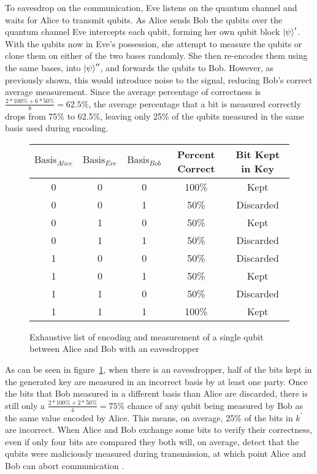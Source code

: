 To eavesdrop on the communication, Eve listens on the quantum channel and waits for Alice to transmit qubits.
As Alice sends Bob the qubits over the quantum channel Eve intercepts each qubit, forming her own qubit block $\ket{\psi}^\prime$.
With the qubits now in Eve's possession, she attempt to measure the qubits or clone them on either of the two bases randomly.
She then re-encodes them using the same bases, into $\ket{\psi}^{\prime\prime}$, and forwards the qubits to Bob.
However, as previously shown, this would introduce noise to the signal, reducing Bob's correct average measurement.
Since the average percentage of correctness is $\frac{2 * 100\% + 6 * 50\%}{8} = 62.5\%$, the average percentage that a bit is measured correctly drops from 75\% to 62.5\%, leaving only 25\% of the qubits measured in the same basis used during encoding.
\begin{figure}[htp]
	\centering
	\begin{tabular}{|c|c|c|c|c|}
		\hline
		$\textrm{Basis}_{Alice}$ & $\textrm{Basis}_{Eve}$ &$\textrm{Basis}_{Bob}$ & Percent Correct & Bit Kept in Key\\ \hline
    	0 & 0 & 0 & 100\% & Kept \\ \hline		
    	0 & 0 & 1 &  50\% & Discarded \\ \hline		
    	0 & 1 & 0 &  50\% & Kept \\ \hline		
    	0 & 1 & 1 &  50\% & Discarded \\ \hline		
    	1 & 0 & 0 &  50\% & Discarded \\ \hline		
    	1 & 0 & 1 &  50\% & Kept \\ \hline		
    	1 & 1 & 0 &  50\% & Discarded \\ \hline		
    	1 & 1 & 1 & 100\% & Kept \\ \hline		
	\end{tabular}
	\caption{Exhaustive list of encoding and measurement of a single qubit between Alice and Bob with an eavesdropper}
	\label{fig:possible_measurements_eve}
\end{figure}
As can be seen in figure~\ref{fig:possible_measurements_eve}, when there is an eavesdropper, half of the bits kept in the generated key are measured in an incorrect basis by at least one party.
Once the bits that Bob measured in a different basis than Alice are discarded, there is still only a $\frac{2 * 100\% + 2 * 50\%}{4} = 75\%$ chance of any qubit being measured by Bob as the same value encoded by Alice.
This means, on average, 25\% of the bits in $k^\prime$ are incorrect.
When Alice and Bob exchange some bits to verify their correctness, even if only four bits are compared they both will, on average, detect that the qubits were maliciously measured during transmission, at which point Alice and Bob can abort communication \cite{MikeAndIke}. 

